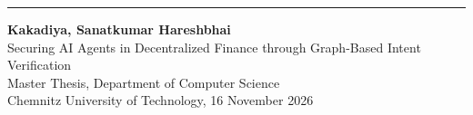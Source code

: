 \thispagestyle{empty} %
\noindent\rule{\textwidth}{0.5pt}
\vspace*{0pt} %
\vfill 


\begin{flushleft}
\textbf{Kakadiya, Sanatkumar Hareshbhai} \\
Securing AI Agents in Decentralized Finance through Graph-Based Intent Verification \\
Master Thesis, Department of Computer Science \\
Chemnitz University of Technology, 16 November 2026
\end{flushleft}